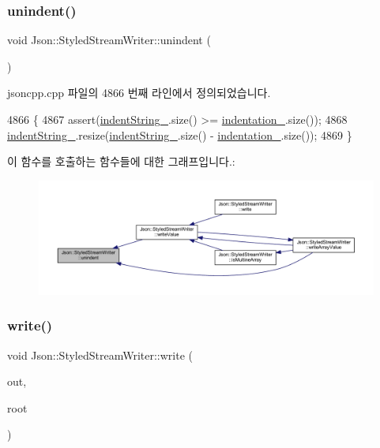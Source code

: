 \subsubsection{\texorpdfstring{unindent()}{unindent()}}
{\footnotesize\ttfamily void Json\+::\+Styled\+Stream\+Writer\+::unindent (\begin{DoxyParamCaption}{ }\end{DoxyParamCaption})\hspace{0.3cm}{\ttfamily [private]}}



jsoncpp.\+cpp 파일의 4866 번째 라인에서 정의되었습니다.


\begin{DoxyCode}
4866                                   \{
4867   assert(\hyperlink{class_json_1_1_styled_stream_writer_a1481433ebe1491ea83b0beb92aed56c2}{indentString\_}.size() >= \hyperlink{class_json_1_1_styled_stream_writer_aa45d8fb4ca82d0550be9042012303713}{indentation\_}.size());
4868   \hyperlink{class_json_1_1_styled_stream_writer_a1481433ebe1491ea83b0beb92aed56c2}{indentString\_}.resize(\hyperlink{class_json_1_1_styled_stream_writer_a1481433ebe1491ea83b0beb92aed56c2}{indentString\_}.size() - 
      \hyperlink{class_json_1_1_styled_stream_writer_aa45d8fb4ca82d0550be9042012303713}{indentation\_}.size());
4869 \}
\end{DoxyCode}
이 함수를 호출하는 함수들에 대한 그래프입니다.\+:\nopagebreak
\begin{figure}[H]
\begin{center}
\leavevmode
\includegraphics[width=350pt]{class_json_1_1_styled_stream_writer_a74d8fb9beecd29759d7b79f430386358_icgraph}
\end{center}
\end{figure}
\mbox{\label{class_json_1_1_styled_stream_writer_a5d89d984fe675641e42c4370cd247774}} 
\subsubsection{\texorpdfstring{write()}{write()}}
{\footnotesize\ttfamily void Json\+::\+Styled\+Stream\+Writer\+::write (\begin{DoxyParamCaption}\item[{\hyperlink{json_8h_a37a25be5fca174927780caeb280094ce}{J\+S\+O\+N\+C\+P\+P\+\_\+\+O\+S\+T\+R\+E\+AM} \&}]{out,  }\item[{const \hyperlink{class_json_1_1_value}{Value} \&}]{root }\end{DoxyParamCaption})}



